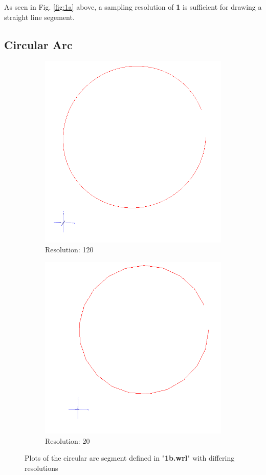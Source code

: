 \documentclass[acmlarge,nonacm=true]{acmart}
\begin{document}
As seen in Fig. \ref{fig:1a} above, a sampling resolution of \textbf{1} is sufficient for drawing a straight line segement.

\subsection{Circular Arc}
\begin{figure}[H]
	\begin{subfigure}{.4\textwidth}
	  \centering
	  \includegraphics[width=.8\linewidth]{fig/1b120}
	  \caption{Resolution: 120}
	\end{subfigure}%
	\begin{subfigure}{.4\textwidth}
	  \centering
	  \includegraphics[width=.8\linewidth]{fig/1b20}
	  \caption{Resolution: 20}
	\end{subfigure}
	\caption{Plots of the circular arc segment defined in "\textbf{1b.wrl}" with differing resolutions}
	\label{fig:1b}
\end{figure}
\end{document}
